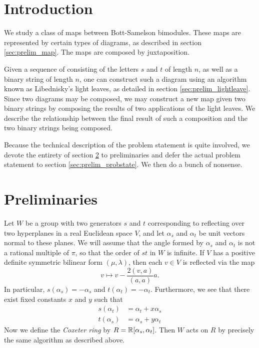 
\section{Introduction}
We study a class of maps between Bott-Samelson bimodules.  These maps are represented by certain types of diagrams, as described in section \ref{sec:prelim_map}.  The maps are composed by juxtaposition.

Given a sequence of consisting of the letters $s$ and $t$ of length $n$, as well as a binary string of length $n$, one can construct such a diagram using an algorithm known as Libednisky's light leaves, as detailed in section \ref{sec:prelim_lightleave}.  Since two diagrams may be composed, we may construct a new map given two binary strings by composing the results of two applications of the light leaves.  We describe the relationship between the final result of such a composition and the two binary strings being composed.

Because the technical description of the problem statement is quite involved, we devote the entirety of section \ref{sec:prelim} to preliminaries and defer the actual problem statement to section \ref{sec:prelim_probstate}.  
We then do a bunch of nonsense.

\section{Preliminaries}
\label{sec:prelim}
Let $W$ be a group with two generators $s$ and $t$ corresponding to reflecting over two hyperplanes in a real Euclidean space $V$, and let $\alpha_s$ and $\alpha_t$ be unit vectors normal to these planes.  We will assume that the angle formed by $\alpha_s$ and $\alpha_t$ is not a rational multiple of $\pi$, so that the order of $st$ in $W$ is infinite.  If $V$ has a positive definite symmetric bilinear form $(\mu, \lambda)$, then each $v \in V$ is reflected via the map \[ v \mapsto v - \frac{2(v,a)}{(a,a)} a. \]  In particular, $s(\alpha_s) = -\alpha_s$ and $t(\alpha_t) = -\alpha_t$.  Furthermore, we see that there exist fixed constants $x$ and $y$ such that
\begin{align*}
	s(\alpha_t) &= \alpha_t + x \alpha_s \\
	t(\alpha_s) &= \alpha_s + y \alpha_t
\end{align*}
Now we define the \emph{Coxeter ring} by $R = \mathbb R[\alpha_s, \alpha_t]$.  Then $W$ acts on $R$ by precisely the same algorithm as described above.

